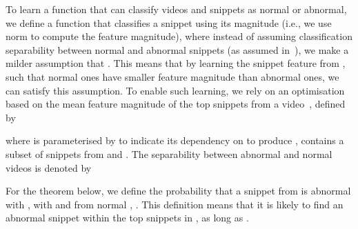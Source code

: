 \documentclass[final]{cvpr}
\begin{document}
To learn a function that can classify videos and snippets as normal or abnormal, we define a function that classifies a snippet using its magnitude (i.e., we use  norm to compute the feature magnitude),
where instead of assuming classification separability between normal and abnormal snippets (as assumed in~\cite{li2015multiple}), we make a milder assumption that 
.  
This means that by learning the snippet feature from , such that normal ones have smaller feature magnitude than abnormal ones, we can satisfy this assumption. To enable such learning, we rely on an optimisation based on the mean feature magnitude of the top  snippets from a video~\cite{li2015multiple}, 
defined by 

where  is parameterised by  to indicate its dependency on  to produce ,
 contains a subset of  snippets from  and . The separability between abnormal and normal videos is denoted by

For the theorem below, we define the probability that a snippet from  is abnormal with , with  and from normal  , .  This definition means that it is likely to find an abnormal snippet within the top  snippets in , as long as .
\end{document}
